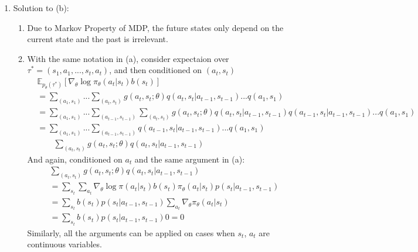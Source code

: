 \documentclass[12pt]{article}
\begin{document}
\begin{enumerate}
\item Solution to (b): \\
\begin{enumerate}
\item Due to Markov Property of MDP, the future states only depend on the current state and the past is irrelevant.
\item With the same notation in (a), consider expectaion over $\tau^*=(s_1, a_1, ..., s_t, a_t)$, and then conditioned on  $(a_t, s_t)$
\begin{align*}
	&\mathbb{E}_{p_\theta(\tau^*)} [\nabla_\theta \log \pi_\theta(a_t|s_t) b(s_{t})] \\
	&=\sum_{(a_1,s_1)}...\sum_{(a_t, s_t)} g(a_t, s_t; \theta)q(a_t, s_t|a_{t-1}, s_{t-1})...q(a_1, s_1) \\
	&=\sum_{(a_1,s_1)}...\sum_{(a_{t-1}, s_{t-1})} \sum_{(a_t, s_t)}g(a_t, s_t; \theta)q(a_t, s_t|a_{t-1}, s_{t-1})q(a_{t-1}, s_t|a_{t-1}, s_{t-1})...q(a_1, s_1) \\
	&=\sum_{(a_1,s_1)}...\sum_{(a_{t-1}, s_{t-1})}q(a_{t-1}, s_t|a_{t-1}, s_{t-1})...q(a_1, s_1) \\
	&\qquad \sum_{(a_t, s_t)}g(a_t, s_t; \theta)q(a_t, s_t|a_{t-1}, s_{t-1})
\end{align*}
And again, conditioned on $a_t$ and the same argument in (a):
\begin{align*}
	&\sum_{(a_t, s_t)}g(a_t, s_t; \theta)q(a_t, s_t|a_{t-1}, s_{t-1}) \\
	&= \sum_{s_t} \sum_{a_t} \nabla_\theta \log \pi(a_t|s_t)b(s_t)\pi_\theta(a_t|s_t)p(s_t|a_{t-1}, s_{t-1}) \\
	&= \sum_{s_t} b(s_t)p(s_t|a_{t-1}, s_{t-1}) \sum_{a_t} \nabla_\theta \pi_\theta(a_t|s_t) \\
	&= \sum_{s_t} b(s_t)p(s_t|a_{t-1}, s_{t-1}) 0 = 0
\end{align*}
Similarly, all the arguments can be applied on cases when $s_t$, $a_t$ are continuous variables. \\
\end{enumerate}
\end{enumerate}
\end{document}
